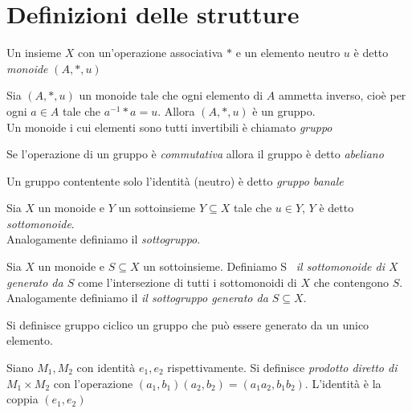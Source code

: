    \section{Definizioni delle strutture}
        \begin{definition}[Monoide]\label{def:monoide}
            Un insieme $X$ con un'operazione associativa $*$ e un elemento neutro $u$ è detto \emph{monoide} $(A,*,u)$
        \end{definition}
        \begin{definition}[Gruppo]
            Sia $(A,*,u)$ un monoide tale che ogni elemento di $A$ ammetta inverso, cioè per ogni $a \in A$ tale che $a^{-1}*a = u$. Allora $(A,*,u)$ è un gruppo.\\
            Un monoide i cui elementi sono tutti invertibili è chiamato \emph{gruppo}
        \end{definition}
        \begin{definition}
            Se l'operazione di un gruppo è \emph{commutativa} allora il gruppo è detto \emph{abeliano}
        \end{definition}
        \begin{definition}
            Un gruppo contentente solo l'identità (neutro) è detto \emph{gruppo banale}
        \end{definition}
        \begin{definition}
            Sia $X$ un monoide e $Y$ un sottoinsieme $Y \subseteq X$ tale che $u \in Y$, $Y$ è detto \emph{sottomonoide}.\\
            Analogamente definiamo il \emph{sottogruppo}.
        \end{definition}
        \begin{definition}
            Sia $X$ un monoide e $S \subseteq X$ un sottoinsieme. Definiamo \textlangle S \textrangle \ \emph{il sottomonoide di $X$ generato da $S$}
            come l'intersezione di tutti i sottomonoidi di $X$ che contengono $S$.\\
            Analogamente definiamo il \emph{il sottogruppo generato da $S \subseteq X$}.
        \end{definition}
        \begin{definition}\label{def:gruppo_ciclico}
            Si definisce gruppo ciclico un gruppo che può essere generato da un unico elemento.
        \end{definition}
        \begin{definition}\label{def:prodotto_diretto_monoidi}
            Siano $M_1, M_2$ con identità $e_1,e_2$ rispettivamente.
            Si definisce \emph{prodotto diretto di $M_1 \times M_2$} con l'operazione $(a_1,b_1)(a_2,b_2)=(a_1a_2, b_1b_2).$
            L'identità è la coppia $(e_1,e_2)$
        \end{definition}
